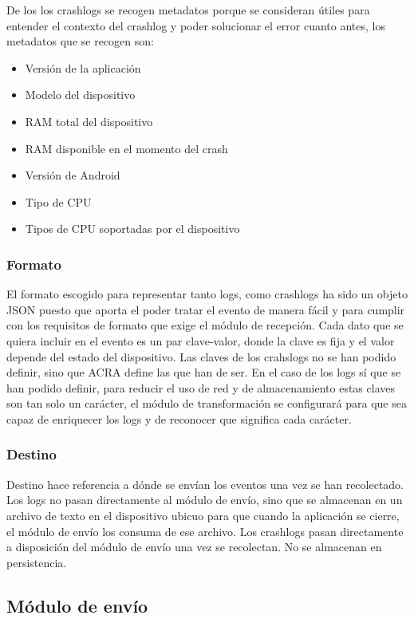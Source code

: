 De los los crashlogs se recogen metadatos porque se consideran útiles para entender el contexto del crashlog y poder solucionar el error cuanto antes, los metadatos que se recogen son:

\begin{itemize}
	\item Versión de la aplicación
	\item Modelo del dispositivo
	\item RAM total del dispositivo
	\item RAM disponible en el momento del crash
	\item Versión de Android
	\item Tipo de CPU
	\item Tipos de CPU soportadas por el dispositivo
\end{itemize}

\subsubsection{Formato}
El formato escogido para representar tanto logs, como crashlogs ha sido un objeto JSON puesto que aporta el poder tratar el evento de manera fácil y para cumplir con los requisitos de formato que exige el módulo de recepción. Cada dato que se quiera incluir en el evento es un par clave-valor, donde la clave es fija y el valor depende del estado del dispositivo. Las claves de los crahslogs no se han podido definir, sino que ACRA define las que han de ser. En el caso de los logs sí que se han podido definir, para reducir el uso de red y de almacenamiento estas claves son tan solo un carácter, el módulo de transformación se configurará para que sea capaz de enriquecer los logs y de reconocer que significa cada carácter. 

\subsubsection{Destino}
Destino hace referencia a dónde se envían los eventos una vez se han recolectado. 
Los logs no pasan directamente al módulo de envío, sino que se almacenan en un archivo de texto en el dispositivo ubicuo para que cuando la aplicación se cierre, el módulo de envío los consuma de ese archivo.
Los crashlogs pasan directamente a disposición del módulo de envío una vez se recolectan. No se almacenan en persistencia. 

\subsection{Módulo de envío}

